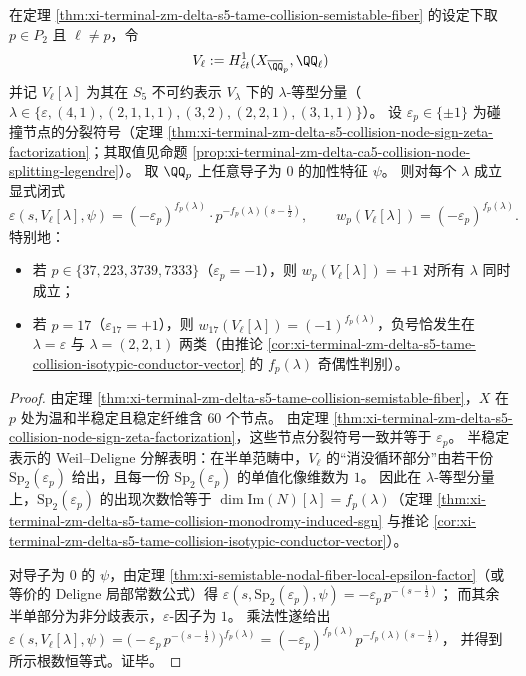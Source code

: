 \begin{theorem}\label{thm:xi-terminal-zm-delta-s5-isotypic-local-epsilon-factor-exponent-law}
在定理 \ref{thm:xi-terminal-zm-delta-s5-tame-collision-semistable-fiber} 的设定下取 \(p\in P_2\) 且 \(\ell\neq p\)，令
\[
V_\ell:=H^1_{\acute e t}(X_{\overline{\QQ}_p},\QQ_\ell)
\]
并记 \(V_\ell[\lambda]\) 为其在 \(S_5\) 不可约表示 \(V_\lambda\) 下的 \(\lambda\)-等型分量（\(\lambda\in\{\varepsilon,(4,1),(2,1,1,1),(3,2),(2,2,1),(3,1,1)\}\)）。
设 \(\varepsilon_p\in\{\pm 1\}\) 为碰撞节点的分裂符号（定理 \ref{thm:xi-terminal-zm-delta-s5-collision-node-sign-zeta-factorization}；其取值见命题 \ref{prop:xi-terminal-zm-delta-ca5-collision-node-splitting-legendre}）。
取 \(\QQ_p\) 上任意导子为 \(0\) 的加性特征 \(\psi\)。
则对每个 \(\lambda\) 成立显式闭式
\[
\varepsilon\!\left(s,V_\ell[\lambda],\psi\right)=(-\varepsilon_p)^{f_p(\lambda)}\cdot p^{-f_p(\lambda)\left(s-\tfrac12\right)},
\qquad
w_p\!\left(V_\ell[\lambda]\right)=(-\varepsilon_p)^{f_p(\lambda)}.
\]
特别地：
\begin{itemize}
  \item 若 \(p\in\{37,223,3739,7333\}\)（\(\varepsilon_p=-1\)），则 \(w_p(V_\ell[\lambda])=+1\) 对所有 \(\lambda\) 同时成立；
  \item 若 \(p=17\)（\(\varepsilon_{17}=+1\)），则 \(w_{17}(V_\ell[\lambda])=(-1)^{f_p(\lambda)}\)，负号恰发生在 \(\lambda=\varepsilon\) 与 \(\lambda=(2,2,1)\) 两类（由推论 \ref{cor:xi-terminal-zm-delta-s5-tame-collision-isotypic-conductor-vector} 的 \(f_p(\lambda)\) 奇偶性判别）。
\end{itemize}
\end{theorem}
\begin{proof}
由定理 \ref{thm:xi-terminal-zm-delta-s5-tame-collision-semistable-fiber}，\(X\) 在 \(p\) 处为温和半稳定且稳定纤维含 \(60\) 个节点。
由定理 \ref{thm:xi-terminal-zm-delta-s5-collision-node-sign-zeta-factorization}，这些节点分裂符号一致并等于 \(\varepsilon_p\)。
半稳定表示的 Weil--Deligne 分解表明：在半单范畴中，\(V_\ell\) 的“消没循环部分”由若干份 \(\mathrm{Sp}_2(\varepsilon_p)\) 给出，且每一份 \(\mathrm{Sp}_2(\varepsilon_p)\) 的单值化像维数为 \(1\)。
因此在 \(\lambda\)-等型分量上，\(\mathrm{Sp}_2(\varepsilon_p)\) 的出现次数恰等于 \(\dim\mathrm{Im}(N)[\lambda]=f_p(\lambda)\)（定理 \ref{thm:xi-terminal-zm-delta-s5-tame-collision-monodromy-induced-sgn} 与推论 \ref{cor:xi-terminal-zm-delta-s5-tame-collision-isotypic-conductor-vector}）。
\par
对导子为 \(0\) 的 \(\psi\)，由定理 \ref{thm:xi-semistable-nodal-fiber-local-epsilon-factor}（或等价的 Deligne 局部常数公式）得
\(
\varepsilon(s,\mathrm{Sp}_2(\varepsilon_p),\psi)=-\varepsilon_p\,p^{-(s-\tfrac12)}
\)；
而其余半单部分为非分歧表示，\(\varepsilon\)-因子为 \(1\)。
乘法性遂给出
\(
\varepsilon(s,V_\ell[\lambda],\psi)=\bigl(-\varepsilon_p\,p^{-(s-\tfrac12)}\bigr)^{f_p(\lambda)}
=(-\varepsilon_p)^{f_p(\lambda)}p^{-f_p(\lambda)(s-\tfrac12)}
\)，
并得到所示根数恒等式。证毕。
\end{proof}

